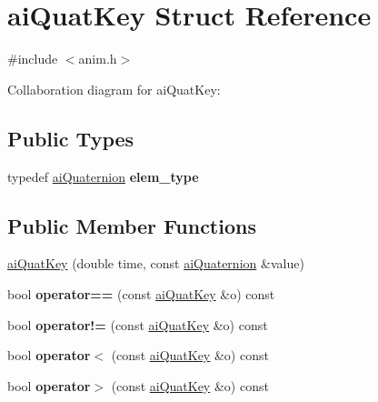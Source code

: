 \hypertarget{structai_quat_key}{\section{ai\-Quat\-Key Struct Reference}
\label{structai_quat_key}
}


{\ttfamily \#include $<$anim.\-h$>$}



Collaboration diagram for ai\-Quat\-Key\-:
\subsection*{Public Types}
\begin{DoxyCompactItemize}
\item 
\hypertarget{structai_quat_key_a11fac9a9521069d3abfee36243983746}{typedef \hyperlink{structai_quaternion}{ai\-Quaternion} {\bfseries elem\-\_\-type}}\label{structai_quat_key_a11fac9a9521069d3abfee36243983746}

\end{DoxyCompactItemize}
\subsection*{Public Member Functions}
\begin{DoxyCompactItemize}
\item 
\hyperlink{structai_quat_key_a74df2186e9f4b3824f558efabe40ade0}{ai\-Quat\-Key} (double time, const \hyperlink{structai_quaternion}{ai\-Quaternion} \&value)
\item 
\hypertarget{structai_quat_key_aa6774c0fe72085cfa433dcf8be5e01a2}{bool {\bfseries operator==} (const \hyperlink{structai_quat_key}{ai\-Quat\-Key} \&o) const }\label{structai_quat_key_aa6774c0fe72085cfa433dcf8be5e01a2}

\item 
\hypertarget{structai_quat_key_a20b37b6e92e2e15fc16d5886cc9353f2}{bool {\bfseries operator!=} (const \hyperlink{structai_quat_key}{ai\-Quat\-Key} \&o) const }\label{structai_quat_key_a20b37b6e92e2e15fc16d5886cc9353f2}

\item 
\hypertarget{structai_quat_key_afc417ba93278234f2efd67f786f63c3d}{bool {\bfseries operator$<$} (const \hyperlink{structai_quat_key}{ai\-Quat\-Key} \&o) const }\label{structai_quat_key_afc417ba93278234f2efd67f786f63c3d}

\item 
\hypertarget{structai_quat_key_ab97345c57ab536de0f386c2b522bc1af}{bool {\bfseries operator$>$} (const \hyperlink{structai_quat_key}{ai\-Quat\-Key} \&o) const }\label{structai_quat_key_ab97345c57ab536de0f386c2b522bc1af}

\end{DoxyCompactItemize}
